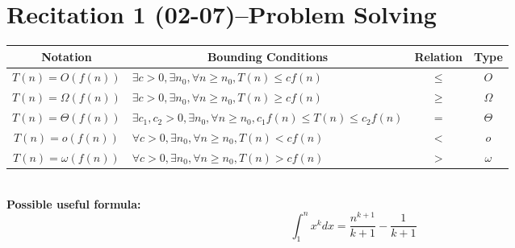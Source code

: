 \section{Recitation 1 (02-07)--{Problem Solving}}
\begin{tabular}{|c|l|c|c|}
    \hline
    \textbf{Notation} & \multicolumn{1}{c|}{\textbf{Bounding Conditions}} & \textbf{Relation} & \textbf{Type} \\ 
    \hline
    $T(n) = O(f(n))$ & $\exists c > 0, \exists n_0, \forall n \geq n_0, T(n) \leq c f(n)$ & $\leq$ & $O$ \\
    \hline
    $T(n) = \Omega(f(n))$ & $\exists c > 0, \exists n_0, \forall n \geq n_0, T(n) \geq c f(n)$ & $\geq$ & $\Omega$ \\
    \hline
    $T(n) = \Theta(f(n))$ & $\exists c_1, c_2 > 0, \exists n_0, \forall n \geq n_0, c_1 f(n) \leq T(n) \leq c_2 f(n)$ & $ = $ & $\Theta$ \\
    \hline
    $T(n) = o(f(n))$ & $\forall c > 0, \exists n_0, \forall n \geq n_0, T(n) < c f(n)$ & $<$ & $o$ \\
    \hline
    $T(n) = \omega(f(n))$ & $\forall c > 0, \exists n_0, \forall n \geq n_0, T(n) > c f(n)$ & $>$ & $\omega$ \\
    \hline
    \end{tabular}
\\
\textbf{Possible useful formula:}
$$
    \int_1^nx^kdx=\frac{n^{k+1}}{k+1}-\frac{1}{k+1}
$$ 

